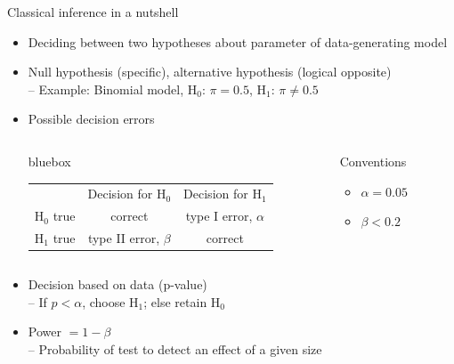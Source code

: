 \documentclass[aspectratio=169]{beamer}
\newenvironment{colbox}[1][\textwidth]%
  {\begin{beamercolorbox}[wd=#1, rounded=true, shadow=true]{bluebox}}
  {\end{beamercolorbox}}
\begin{document}
\begin{frame}{Classical inference in a nutshell}

\begin{itemize}
\item Deciding between two hypotheses about parameter of data-generating
model \citep{NeymanPearson33}

\item Null hypothesis (specific), alternative hypothesis (logical opposite)\\
-- Example: Binomial model, H$_0$: $\pi = 0.5$, H$_1$: $\pi \neq 0.5$

\item Possible decision errors\\[1ex]

\renewcommand{\arraystretch}{1.2}
\begin{columns}
\begin{column}{7cm}
\begin{colbox}[7.6cm]
\centering
\begin{tabular}{l|c|c|}
\multicolumn{1}{l}{} & \multicolumn{1}{c}{Decision for H$_0$}
 & \multicolumn{1}{c}{Decision for H$_1$}\\ \cline{2-3}
H$_0$ true & correct                & type I error, $\alpha$\\ \cline{2-3}
H$_1$ true & type II error, $\beta$ & correct               \\ \cline{2-3}
\end{tabular}
\end{colbox}
\end{column}
%
\begin{column}{3cm}
Conventions
\begin{itemize}
\item $\alpha = 0.05$
\item $\beta < 0.2$
\end{itemize}
\end{column}
\end{columns}

\vspace{1ex}

\item Decision based on data (p-value)\\
-- If $p < \alpha$, choose H$_1$; else retain H$_0$

\item Power $= 1 - \beta$\\
-- Probability of test to detect an effect of a given size
\end{itemize}

\end{frame}
\end{document}
